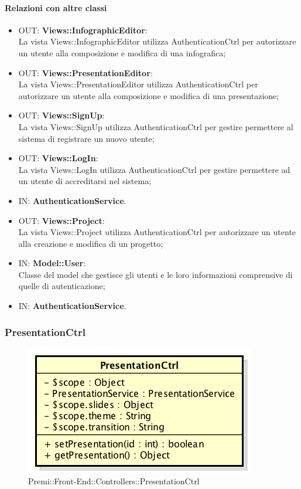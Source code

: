 	\paragraph{Relazioni con altre classi}
	\begin{itemize}
	  \item OUT: \textbf{Views::InfographicEditor}:\\
		La vista Views::InfographicEditor utilizza AuthenticationCtrl per autorizzare un utente alla composizione e modifica di una infografica;	
	  \item OUT: \textbf{Views::PresentationEditor}:\\
		La vista Views::PresentationEditor utilizza AuthenticationCtrl per autorizzare un utente alla composizione e modifica di una presentazione;
	  \item OUT: \textbf{Views::SignUp}:\\
		La vista Views::SignUp utilizza AuthenticationCtrl per gestire permettere al sistema di registrare un nuovo utente;
	  \item OUT: \textbf{Views::LogIn}:\\
	  		La vista Views::LogIn utilizza AuthenticationCtrl per gestire permettere ad un utente di accreditarsi nel sistema;
	  \item IN: \textbf{AuthenticationService}.	
	  \item OUT: \textbf{Views::Project}:\\
		La vista Views::Project utilizza AuthenticationCtrl per autorizzare un utente alla creazione e modifica di un progetto;	
	  \item IN: \textbf{Model::User}:\\
		Classe del model che gestisce gli utenti e le loro informazioni comprensive di quelle di autenticazione;
	  \item IN: \textbf{AuthenticationService}.
	  
	\end{itemize}	
	
\newpage
\subsubsection{PresentationCtrl}
\begin{figure}[h]
	\centering
	\includegraphics[width=0.4\linewidth]{img/premi_front_end_controllers_presentationctrl}
	\caption[Premi::Front-End::Controllers::PresentationCtrl]{Premi::Front-End::Controllers::PresentationCtrl}
\end{figure}
